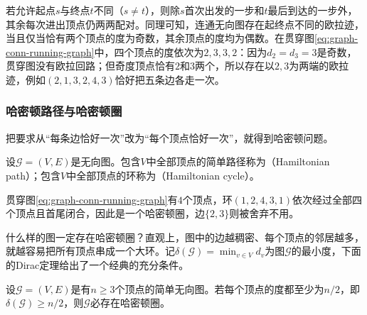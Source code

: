若允许起点$s$与终点$t$不同（$s\neq t$），则除$s$首次出发的一步和$t$最后到达的一步外，其余每次进出顶点仍两两配对。同理可知，连通无向图存在起终点不同的欧拉迹，当且仅当恰有两个顶点的度为奇数，其余顶点的度均为偶数。在贯穿图\eqref{eq:graph-conn-running-graph}中，四个顶点的度依次为$2,3,3,2$：因为$d_2=d_3=3$是奇数，贯穿图没有欧拉回路；但奇度顶点恰有$2$和$3$两个，所以存在以$2,3$为两端的欧拉迹，例如$(2,1,3,2,4,3)$恰好把五条边各走一次。

\subsubsection{哈密顿路径与哈密顿圈}
\label{sec:graph-hamilton-cycle}

把要求从“每条边恰好一次”改为“每个顶点恰好一次”，就得到哈密顿问题。

\begin{definition}[哈密顿路径与哈密顿圈]
\label{def:graph-hamilton-cycle}
设$\mathcal G=(V,E)$是无向图。包含$V$中全部顶点的简单路径称为（Hamiltonian path）；包含$V$中全部顶点的环称为（Hamiltonian cycle）。
\end{definition}

贯穿图\eqref{eq:graph-conn-running-graph}有$4$个顶点，环$(1,2,4,3,1)$依次经过全部四个顶点且首尾闭合，因此是一个哈密顿圈，边$\{2,3\}$则被舍弃不用。

什么样的图一定存在哈密顿圈？直观上，图中的边越稠密、每个顶点的邻居越多，就越容易把所有顶点串成一个大环。记$\delta(\mathcal G)=\min_{v\in V}d_v$为图$\mathcal G$的最小度，下面的Dirac定理给出了一个经典的充分条件。

\begin{theorem}[Dirac定理]
\label{thm:graph-dirac-hamilton}
设$\mathcal G=(V,E)$是有$n\geq 3$个顶点的简单无向图。若每个顶点的度都至少为$n/2$，即$\delta(\mathcal G)\geq n/2$，则$\mathcal G$必存在哈密顿圈。
\end{theorem}

